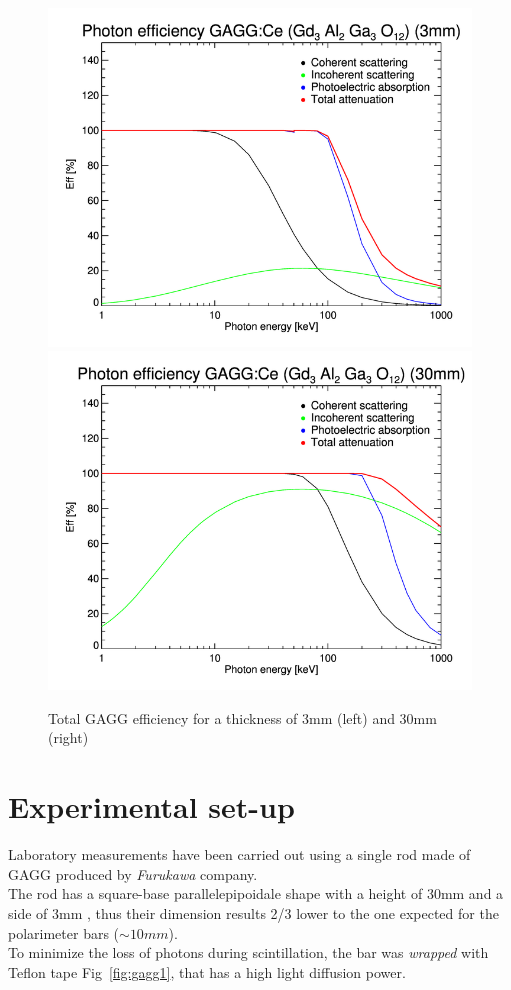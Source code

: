 \documentclass[10pt,a4paper, openany]{book}
\begin{document}
\begin{figure}[!h]
\begin{center}
\includegraphics[scale=0.26]{imm/eff_gagg_3mm.png}
\includegraphics[scale=0.26]{imm/eff_gagg_30mm.png}
\end{center}
\caption{Total GAGG efficiency for a thickness of 3mm (left) and 30mm (right)}
\label{fig:eff_gagg}
\end{figure}


\section{Experimental set-up}
Laboratory measurements have been carried out using a single rod made of GAGG produced by \emph{Furukawa} company.\\
The rod has a square-base parallelepipoidale shape with a height of 30mm and a side of 3mm , thus their dimension results 2/3 lower  to the one expected for the polarimeter bars ($\sim 10mm$).\\
To minimize the loss of photons during scintillation, the bar was \emph{wrapped} with Teflon tape Fig~\ref{fig:gagg1}, that has a high light diffusion power.
\end{document}
